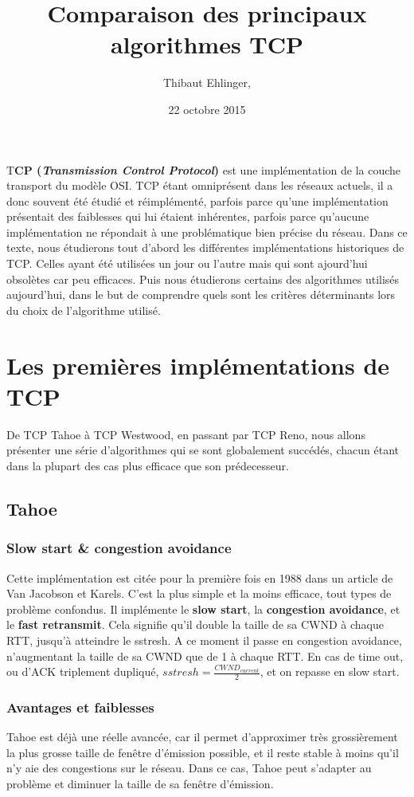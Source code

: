\documentclass[	DIV=calc,%
							paper=a4,%
							fontsize=11pt,%
							twocolumn]{scrartcl}	 					%
\title{Comparaison des principaux algorithmes TCP}					%
\author{Thibaut Ehlinger, }											%
\date{22 octobre 2015}
\newcommand{\initial}[1]{%
     \lettrine[lines=3,lhang=0.3,nindent=0em]{
     				\color{DarkGoldenrod}
     				{\textsf{#1}}}{}}
\begin{document}
\maketitle
\thispagestyle{fancy} 			%
\initial{T}\textbf{CP (\textit{Transmission Control Protocol})} est une implémentation de la couche transport du modèle OSI. TCP étant omniprésent dans les réseaux actuels, il a donc souvent été étudié et réimplémenté, parfois parce qu'une implémentation présentait des faiblesses qui lui étaient inhérentes, parfois parce qu'aucune implémentation ne répondait à une problématique bien précise du réseau. Dans ce texte, nous étudierons tout d'abord les différentes implémentations historiques de TCP. Celles ayant été utilisées un jour ou l'autre mais qui sont ajourd'hui obsolètes car peu efficaces. Puis nous étudierons certains des algorithmes utilisés aujourd'hui, dans le but de comprendre quels sont les critères déterminants lors du choix de l'algorithme utilisé.

\section*{Les premières implémentations de TCP}
De TCP Tahoe à TCP Westwood, en passant par TCP Reno, nous allons présenter une série d'algorithmes qui se sont globalement succédés, chacun étant dans la plupart des cas plus efficace que son prédecesseur.

\subsection*{Tahoe}
\subsubsection*{Slow start \& congestion avoidance}
Cette implémentation est citée pour la première fois en 1988 dans un article de Van Jacobson et Karels. C'est la plus simple et la moins efficace, tout types de problème confondus. Il implémente le \textbf{slow start}, la \textbf{congestion avoidance}, et le \textbf{fast retransmit}. 
Cela signifie qu'il double la taille de sa CWND à chaque RTT, jusqu'à atteindre le sstresh. A ce moment il passe en congestion avoidance, n'augmentant la taille de sa CWND que de 1 à chaque RTT. En cas de time out, ou d'ACK triplement dupliqué, $sstresh=\frac{CWND_{current}}{2}$, et on repasse en slow start.
\subsubsection*{Avantages et faiblesses}
Tahoe est déjà une réelle avancée, car il permet d'approximer très grossièrement la plus grosse taille de fenêtre d'émission possible, et il reste stable à moins qu'il n'y aie des congestions sur le réseau. Dans ce cas, Tahoe peut s'adapter au problème et diminuer la taille de sa fenêtre d'émission.
\end{document}
